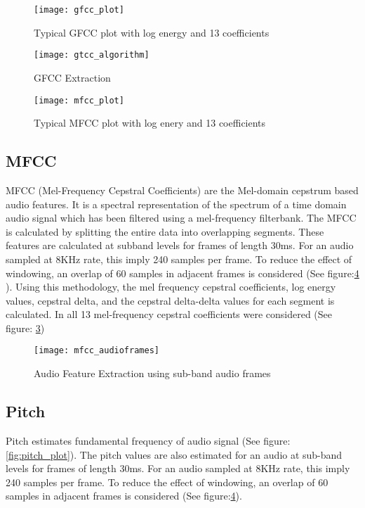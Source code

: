 \begin{figure}
\centering
\texttt{[image: gfcc\_plot]}
\caption{Typical GFCC plot with log energy and 13 coefficients}
\label{fig:gfcc_plot}
\end{figure}

\begin{figure}
\centering
\texttt{[image: gtcc\_algorithm]}
\caption{GFCC Extraction}
\label{fig:gfcc_extraction}
\end{figure}

\begin{figure}
\centering
\texttt{[image: mfcc\_plot]}
\caption{Typical MFCC plot with log enery and 13 coefficients}
\label{fig:mfcc_plot}
\end{figure}

\subsection{\textbf{MFCC}}
MFCC (Mel-Frequency Cepstral Coefficients) are the Mel-domain cepstrum based audio features. It is a spectral representation of the spectrum of a time domain audio signal which has been filtered using a mel-frequency filterbank. The MFCC is calculated by splitting the entire data into overlapping segments. These features are calculated at subband levels for frames of length 30ms. For an audio sampled at 8K\si{\hertz} rate, this imply 240 samples per frame. To reduce the effect of windowing, an overlap of 60 samples in adjacent frames is considered (See figure:\ref{fig:mfcc_extraction} \cite{mathworks:mfcc}). Using this methodology, the mel frequency cepstral coefficients, log energy values, cepstral delta, and the cepstral delta-delta values for each segment is calculated. In all 13 mel-frequency cepstral coefficients were considered (See figure: \ref{fig:mfcc_plot})

\begin{figure}
\centering
\texttt{[image: mfcc\_audioframes]}
\caption{Audio Feature Extraction using sub-band audio frames}
\label{fig:mfcc_extraction}
\end{figure}

\subsection{\textbf{Pitch}}
Pitch estimates fundamental frequency of audio signal (See figure: \ref{fig:pitch_plot}). The pitch values are also estimated for an audio at sub-band levels for frames of length 30ms. For an audio sampled at 8K\si{\hertz} rate, this imply 240 samples per frame. To reduce the effect of windowing, an overlap of 60 samples in adjacent frames is considered (See figure:\ref{fig:mfcc_extraction}\cite{mathworks:mfcc}).

